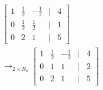 \documentclass[preview]{standalone}
\begin{document}
\begin{align*}
\begin{bmatrix} 1 & \frac{1}{2} & -\frac{1}{2} & | & 4 \\ 0 & \frac{1}{2} & \frac{1}{2} & | & 1 \\ 0 & 2 & 1 & | & 5 \end{bmatrix}\\ \rightarrow_{2\times R_2} \begin{bmatrix} 1 & \frac{1}{2} & -\frac{1}{2} & | & 4 \\ 0 & 1 & 1 & | & 2 \\ 0 & 2 & 1 & | & 5 \end{bmatrix}
\end{align*}
\end{document}

